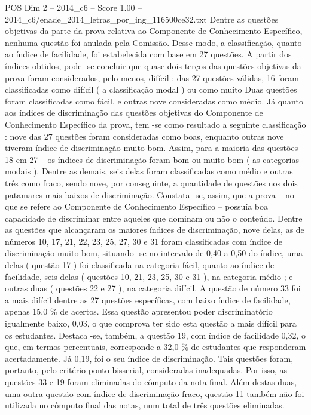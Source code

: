 \begin{textsample}{POS Dim 2 – 2014\_c6 – Score 1.00 – 2014\_c6/enade\_2014\_letras\_por\_ing\_116500ce32.txt}
Dentre as questões objetivas da parte da prova relativa ao Componente de Conhecimento Específico, nenhuma questão foi anulada pela Comissão.
Desse modo, a classificação, quanto ao índice de facilidade, foi estabelecida com base em 27 questões.
A partir dos índices obtidos, pode -se concluir que quase dois terços das questões objetivas da prova foram considerados, pelo menos, difícil : das 27 questões válidas, 16 foram classificadas como difícil ( a classificação modal ) ou como muito Duas questões foram classificadas como fácil, e outras nove consideradas como médio.
Já quanto aos índices de discriminação das questões objetivas do Componente de Conhecimento Específico da prova, tem -se como resultado a seguinte classificação : nove das 27 questões foram consideradas como boas, enquanto outras nove tiveram índice de discriminação muito bom.
Assim, para a maioria das questões – 18 em 27 – os índices de discriminação foram bom ou muito bom ( as categorias modais ).
Dentre as demais, seis delas foram classificadas como médio e outras três como fraco, sendo nove, por conseguinte, a quantidade de questões nos dois patamares mais baixos de discriminação.
Constata -se, assim, que a prova – no que se refere ao Componente de Conhecimento Específico – possuía boa capacidade de discriminar entre aqueles que dominam ou não o conteúdo.
Dentre as questões que alcançaram os maiores índices de discriminação, nove delas, as de números 10, 17, 21, 22, 23, 25, 27, 30 e 31 foram classificadas com índice de discriminação muito bom, situando -se no intervalo de 0,40 a 0,50 do índice, uma delas ( questão 17 ) foi classificada na categoria fácil, quanto ao índice de facilidade, seis delas ( questões 10, 21, 23, 25, 30 e 31 ), na categoria médio ; e outras duas ( questões 22 e 27 ), na categoria difícil.
A questão de número 33 foi a mais difícil dentre as 27 questões específicas, com baixo índice de facilidade, apenas 15,0 \% de acertos.
Essa questão apresentou poder discriminatório igualmente baixo, 0,03, o que comprova ter sido esta questão a mais difícil para os estudantes.
Destaca -se, também, a questão 19, com índice de facilidade 0,32, o que, em termos percentuais, corresponde a 32,0 \% de estudantes que responderam acertadamente.
Já 0,19, foi o seu índice de discriminação.
Tais questões foram, portanto, pelo critério ponto bisserial, consideradas inadequadas.
Por isso, as questões 33 e 19 foram eliminadas do cômputo da nota final.
Além destas duas, uma outra questão com índice de discriminação fraco, questão 11 também não foi utilizada no cômputo final das notas, num total de três questões eliminadas.

\end{textsample}
